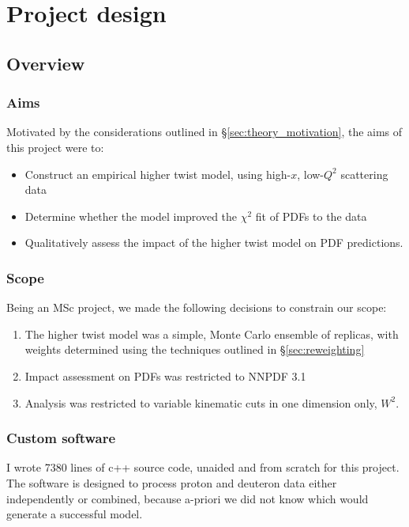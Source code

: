 \documentclass[12pt,a4paper]{report}
\begin{document}
\chapter{Project design}

\section{Overview}

\subsection{Aims} \label{design:aims}

Motivated by the considerations outlined in \S \ref{sec:theory_motivation}, the aims of this project were to:
\begin{itemize}
\item Construct an empirical higher twist model, using high-$x$, low-$Q^2$ scattering data
\item Determine whether the model improved the $\chi^2$ fit of PDFs to the data
\item Qualitatively assess the impact of the higher twist model on PDF predictions.
\end{itemize}

\subsection{Scope} \label{design:scope}

Being an MSc project, we made the following decisions to constrain our scope:

\begin{enumerate}
\item The higher twist model was a simple, Monte Carlo ensemble of replicas, with weights determined using the techniques outlined in \S \ref{sec:reweighting}
\item Impact assessment on PDFs was restricted to NNPDF 3.1 \cite{NNPDF31}
\item Analysis was restricted to variable kinematic cuts in one dimension only, $W^2$.
\end{enumerate}

\subsection{Custom software}

I wrote 7380 lines of c++ source code, unaided and from scratch for this project. The software is designed to process proton and deuteron data either independently or combined, because a-priori we did not know which would generate a successful model.
\end{document}
